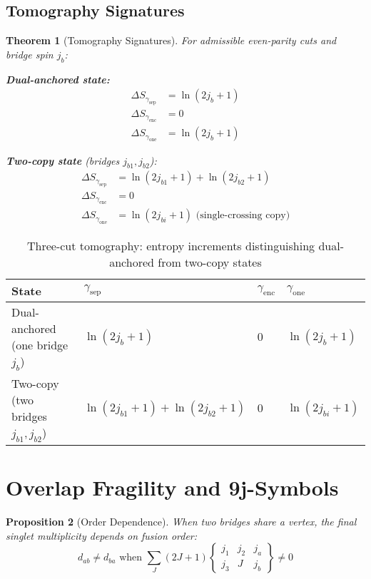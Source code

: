 \documentclass[11pt]{article}
\theoremstyle{plain}
\newtheorem{theorem}{Theorem}[section]
\newtheorem{proposition}[theorem]{Proposition}
\theoremstyle{definition}
\begin{document}
\subsection{Tomography Signatures}

\begin{theorem}[Tomography Signatures]\label{thm:tomography}
  For admissible even-parity cuts and bridge spin $j_b$:

  \textbf{Dual-anchored state:}
  \begin{align}
    \Delta S_{\gamma_{\mathrm{sep}}} &= \ln(2j_b+1) \\
    \Delta S_{\gamma_{\mathrm{enc}}} &= 0 \\
    \Delta S_{\gamma_{\mathrm{one}}} &= \ln(2j_b+1)
  \end{align}

  \textbf{Two-copy state} (bridges $j_{b1}, j_{b2}$):
  \begin{align}
    \Delta S_{\gamma_{\mathrm{sep}}} &= \ln(2j_{b1}+1) + \ln(2j_{b2}+1) \\
    \Delta S_{\gamma_{\mathrm{enc}}} &= 0 \\
    \Delta S_{\gamma_{\mathrm{one}}} &= \ln(2j_{bi}+1) \text{ (single-crossing copy)}
  \end{align}
\end{theorem}

\begin{table}[h]
  \centering
  \setlength{\tabcolsep}{8pt}
  \begin{tabular}{llll}
    \hline
    State & $\gamma_{\mathrm{sep}}$ & $\gamma_{\mathrm{enc}}$ & $\gamma_{\mathrm{one}}$ \\
    \hline
    Dual-anchored (one bridge $j_b$)
    & $\ln(2j_b{+}1)$
    & $0$
    & $\ln(2j_b{+}1)$ \\
    Two-copy (two bridges $j_{b1},j_{b2}$)
    & $\ln(2j_{b1}{+}1)+\ln(2j_{b2}{+}1)$
    & $0$
    & $\ln(2j_{bi}{+}1)$ \\
    \hline
  \end{tabular}
  \caption{Three-cut tomography: entropy increments distinguishing dual-anchored from two-copy states}
  \label{tab:tomography}
\end{table}

\section{Overlap Fragility and 9j-Symbols}
\label{sec:overlap}

\begin{proposition}[Order Dependence]
  When two bridges share a vertex, the final singlet multiplicity depends on fusion order:
  \begin{equation}
    d_{ab} \neq d_{ba} \text{ when } \sum_J (2J+1)
    \begin{Bmatrix} j_1 & j_2 & j_a \\ j_3 & J & j_b
    \end{Bmatrix} \neq 0
  \end{equation}
\end{proposition}
\end{document}
